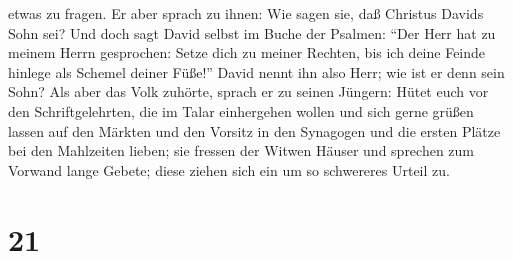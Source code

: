 etwas zu fragen.  Er aber sprach zu ihnen: Wie sagen sie,
daß Christus Davids Sohn sei?  Und doch sagt David selbst
im Buche der Psalmen: ``Der Herr hat zu meinem Herrn gesprochen: Setze
dich zu meiner Rechten,  bis ich deine Feinde hinlege als
Schemel deiner Füße!''  David nennt ihn also Herr; wie
ist er denn sein Sohn?  Als aber das Volk zuhörte, sprach
er zu seinen Jüngern:  Hütet euch vor den
Schriftgelehrten, die im Talar einhergehen wollen und sich gerne grüßen
lassen auf den Märkten und den Vorsitz in den Synagogen und die ersten
Plätze bei den Mahlzeiten lieben;  sie fressen der Witwen
Häuser und sprechen zum Vorwand lange Gebete; diese ziehen sich ein um
so schwereres Urteil zu.

\hypertarget{section-20}{%
\section{21}\label{section-20}}

